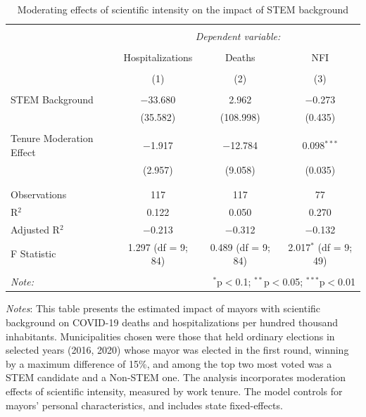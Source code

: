 \documentclass[
  letterpaper,
  DIV=11,
  numbers=noendperiod]{scrartcl}
\begin{document}
\begin{table}[!htbp] \centering 
  \caption{Moderating effects of scientific intensity on the impact of STEM background} 
  \label{} 
\begin{tabular}{@{\extracolsep{5pt}}lccc} 
\\[-1.8ex]\hline 
\hline \\[-1.8ex] 
 & \multicolumn{3}{c}{\textit{Dependent variable:}} \\ 
\cline{2-4} 
\\[-1.8ex] & Hospitalizations & Deaths & NFI \\ 
\\[-1.8ex] & (1) & (2) & (3)\\ 
\hline \\[-1.8ex] 
 STEM Background & $-$33.680 & 2.962 & $-$0.273 \\ 
  & (35.582) & (108.998) & (0.435) \\ 
  & & & \\ 
 Tenure Moderation Effect & $-$1.917 & $-$12.784 & 0.098$^{***}$ \\ 
  & (2.957) & (9.058) & (0.035) \\ 
  & & & \\ 
\hline \\[-1.8ex] 
Observations & 117 & 117 & 77 \\ 
R$^{2}$ & 0.122 & 0.050 & 0.270 \\ 
Adjusted R$^{2}$ & $-$0.213 & $-$0.312 & $-$0.132 \\ 
F Statistic & 1.297 (df = 9; 84) & 0.489 (df = 9; 84) & 2.017$^{*}$ (df = 9; 49) \\ 
\hline 
\hline \\[-1.8ex] 
\textit{Note:}  & \multicolumn{3}{r}{$^{*}$p$<$0.1; $^{**}$p$<$0.05; $^{***}$p$<$0.01} \\ 
\end{tabular} 
\end{table}

\emph{Notes}: This table presents the estimated impact of mayors with
scientific background on COVID-19 deaths and hospitalizations per
hundred thousand inhabitants. Municipalities chosen were those that held
ordinary elections in selected years (2016, 2020) whose mayor was
elected in the first round, winning by a maximum difference of 15\%, and
among the top two most voted was a STEM candidate and a Non-STEM one.
The analysis incorporates moderation effects of scientific intensity,
measured by work tenure. The model controls for mayors' personal
characteristics, and includes state fixed-effects.
\end{document}
